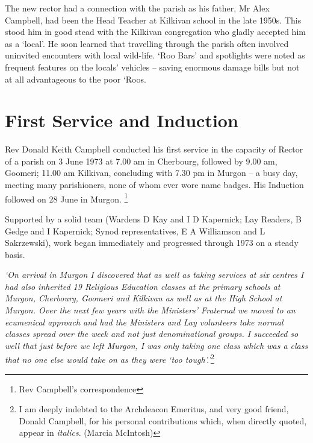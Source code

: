 The new rector had a connection with the parish as his father, Mr Alex Campbell, had been the Head Teacher at Kilkivan school in the late 1950s. This stood him in good stead with the Kilkivan congregation who gladly accepted him as a `local'. He soon learned that travelling through the parish often involved uninvited encounters with local wild-life. `Roo Bars' and spotlights were noted as frequent features on the locals' vehicles -- saving enormous damage bills but not at all advantageous to the poor `Roos.



\section{First Service and Induction}



Rev Donald Keith Campbell conducted his first service in the capacity of Rector of a parish on 3 June 1973 at 7.00 am in Cherbourg, followed by 9.00 am, Goomeri; 11.00 am Kilkivan, concluding with 7.30 pm in Murgon -- a busy day, meeting many parishioners, none of whom ever wore name badges. His Induction followed on 28 June in Murgon. \footnote{Rev Campbell's correspondence}


Supported by a solid team (Wardens D Kay and I D Kapernick; Lay Readers, B Gedge and I Kapernick; Synod representatives, E A Williamson and L Sakrzewski), work began immediately and progressed through 1973 on a steady basis.



\emph{`On arrival in Murgon I discovered that as well as taking services at six centres I had also inherited 19 Religious Education classes at the primary schools at Murgon, Cherbourg, Goomeri and Kilkivan as well as at the High School at Murgon. Over the next few years with the Ministers' Fraternal we moved to an ecumenical approach and had the Ministers and Lay volunteers take normal classes spread over the week and not just denominational groups. I succeeded so well that just before we left Murgon, I was only taking one class which was a class that no one else would take on as they were `too tough'.'}\footnote{I am deeply indebted to the Archdeacon Emeritus, and very good friend, Donald Campbell, for his personal contributions which, when directly quoted, appear in \emph{italics}. (Marcia McIntosh)}


